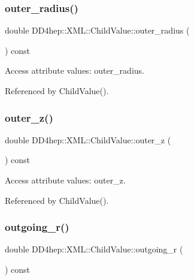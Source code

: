 \subsubsection{\texorpdfstring{outer\+\_\+radius()}{outer\_radius()}}
{\footnotesize\ttfamily double D\+D4hep\+::\+X\+M\+L\+::\+Child\+Value\+::outer\+\_\+radius (\begin{DoxyParamCaption}{ }\end{DoxyParamCaption}) const}



Access attribute values\+: outer\+\_\+radius. 



Referenced by Child\+Value().

\hypertarget{struct_d_d4hep_1_1_x_m_l_1_1_child_value_a4336a60a7568044f7e43183e4fe9ab87}{}\label{struct_d_d4hep_1_1_x_m_l_1_1_child_value_a4336a60a7568044f7e43183e4fe9ab87} 
\subsubsection{\texorpdfstring{outer\+\_\+z()}{outer\_z()}}
{\footnotesize\ttfamily double D\+D4hep\+::\+X\+M\+L\+::\+Child\+Value\+::outer\+\_\+z (\begin{DoxyParamCaption}{ }\end{DoxyParamCaption}) const}



Access attribute values\+: outer\+\_\+z. 



Referenced by Child\+Value().

\hypertarget{struct_d_d4hep_1_1_x_m_l_1_1_child_value_a481b0fd5b0b6030a3166511c0576232a}{}\label{struct_d_d4hep_1_1_x_m_l_1_1_child_value_a481b0fd5b0b6030a3166511c0576232a} 
\subsubsection{\texorpdfstring{outgoing\+\_\+r()}{outgoing\_r()}}
{\footnotesize\ttfamily double D\+D4hep\+::\+X\+M\+L\+::\+Child\+Value\+::outgoing\+\_\+r (\begin{DoxyParamCaption}{ }\end{DoxyParamCaption}) const}



